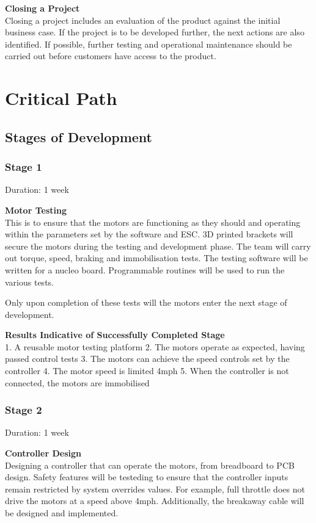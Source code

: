 \documentclass [12pt]{article}
\begin{document}
\textbf{Closing a Project}\\
Closing a project includes an evaluation of the product against the initial business case. If the project is to be developed further, the next actions are also identified. If possible, further testing and operational maintenance should be carried out before customers have access to the product.

\section{Critical Path}\label{sec:critical_path}

\subsection{Stages of Development}\label{sec:stages_of_development}

\subsubsection{Stage 1}

Duration: 1 week

\textbf{Motor Testing}\\
This is to ensure that the motors are functioning as they should and operating within the parameters set by the software and ESC. 3D printed brackets will secure the motors during the testing and development phase. The team will carry out torque, speed, braking and immobilisation tests. The testing software will be written for a nucleo board. Programmable routines will be used to run the various tests.

Only upon completion of these tests will the motors enter the next stage of development.

\textbf{Results Indicative of Successfully Completed Stage}\\
1.	A reusable motor testing platform
2.	The motors operate as expected, having passed control tests
3.	The motors can achieve the speed controls set by the controller
4.	The motor speed is limited 4mph
5.	When the controller is not connected, the motors are immobilised

\subsubsection{Stage 2}

Duration: 1 week

\textbf{Controller Design}\\
Designing a controller that can operate the motors, from breadboard to PCB design. Safety features will be testeding to ensure that the controller inputs remain restricted by system overrides values. For example, full throttle does not drive the motors at a speed above 4mph. Additionally, the breakaway cable will be designed and implemented.
\end{document}
